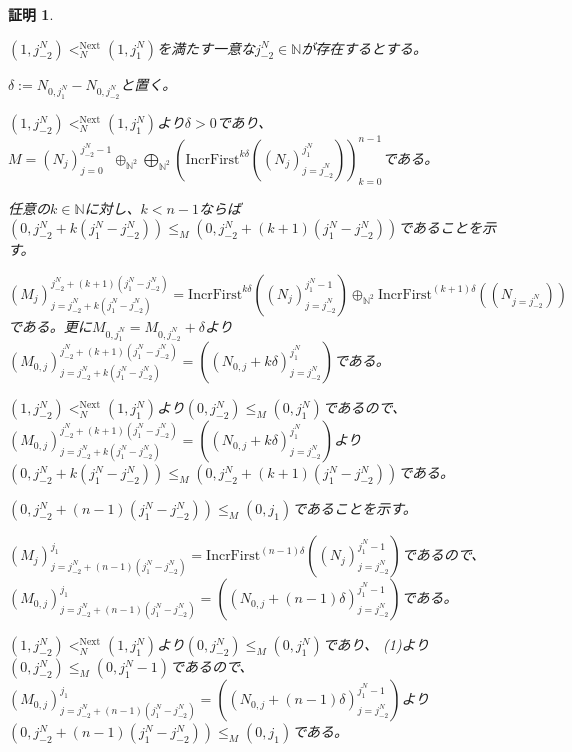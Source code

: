\documentclass[dvipdfmx,uplatex]{jsarticle}
\theoremstyle{customnonumberbreakfortheorem}
\theoremstyle{customnonumberbreakforproof}
\newtheorem{hideableproof}{証明}
\begin{document}
\begin{hideableproof}
\begin{indented}
\begin{indented}
\begin{indented}
				\item \((1,j_{-2}^N) <_N^{\textrm{Next}} (1,j_1^N)\)を満たす一意な\(j_{-2}^N \in \mathbb{N}\)が存在するとする。
				\begin{indented}
					\item \(\delta := N_{0,j_1^N} - N_{0,j_{-2}^N}\)と置く。
					\item \((1,j_{-2}^N) <_N^{\textrm{Next}} (1,j_1^N)\)より\(\delta > 0\)であり、\(M = (N_j)_{j=0}^{j_{-2}^N-1} \oplus_{\mathbb{N}^2} \bigoplus_{\mathbb{N}^2} (\textrm{IncrFirst}^{k \delta}((N_j)_{j=j_{-2}^N}^{j_1^N}))_{k=0}^{n-1}\)である。
					\item
					\item 任意の\(k \in \mathbb{N}\)に対し、\(k < n-1\)ならば\((0,j_{-2}^N+k(j_1^N-j_{-2}^N)) \leq_M (0,j_{-2}^N+(k+1)(j_1^N-j_{-2}^N))\)であることを示す。
					\begin{indented}
						\item \((M_j)_{j =j_{-2}^N+k(j_1^N-j_{-2}^N)}^{j_{-2}^N+(k+1)(j_1^N-j_{-2}^N)} = \textrm{IncrFirst}^{k \delta}((N_j)_{j=j_{-2}^N}^{j_1^N-1}) \oplus_{\mathbb{N}^2} \textrm{IncrFirst}^{(k+1)\delta}((N_{j=j_{-2}^N}))\)である。更に\(M_{0,j_1^N} = M_{0,j_{-2}^N}+\delta\)より\((M_{0,j})_{j =j_{-2}^N+k(j_1^N-j_{-2}^N)}^{j_{-2}^N+(k+1)(j_1^N-j_{-2}^N)} = ((N_{0,j}+k \delta)_{j=j_{-2}^N}^{j_1^N})\)である。
						\item \((1,j_{-2}^N) <_N^{\textrm{Next}} (1,j_1^N)\)より\((0,j_{-2}^N) \leq_M (0,j_1^N)\)であるので、\((M_{0,j})_{j =j_{-2}^N+k(j_1^N-j_{-2}^N)}^{j_{-2}^N+(k+1)(j_1^N-j_{-2}^N)} = ((N_{0,j}+k \delta)_{j=j_{-2}^N}^{j_1^N})\)より\((0,j_{-2}^N+k(j_1^N-j_{-2}^N)) \leq_M (0,j_{-2}^N+(k+1)(j_1^N-j_{-2}^N))\)である。
					\end{indented}
					\item
					\item \((0,j_{-2}^N+(n-1)(j_1^N-j_{-2}^N)) \leq_M (0,j_1)\)であることを示す。
					\begin{indented}
						\item \((M_j)_{j =j_{-2}^N+(n-1)(j_1^N-j_{-2}^N)}^{j_1} = \textrm{IncrFirst}^{(n-1)\delta}((N_j)_{j=j_{-2}^N}^{j_1^N-1})\)であるので、\((M_{0,j})_{j =j_{-2}^N+(n-1)(j_1^N-j_{-2}^N)}^{j_1} = ((N_{0,j}+(n-1)\delta)_{j=j_{-2}^N}^{j_1^N-1})\)である。
						\item \((1,j_{-2}^N) <_N^{\textrm{Next}} (1,j_1^N)\)より\((0,j_{-2}^N) \leq_M (0,j_1^N)\)であり、 (1)より\((0,j_{-2}^N) \leq_M (0,j_1^N-1)\)であるので、\((M_{0,j})_{j =j_{-2}^N+(n-1)(j_1^N-j_{-2}^N)}^{j_1} = ((N_{0,j}+(n-1)\delta)_{j=j_{-2}^N}^{j_1^N-1})\)より\((0,j_{-2}^N+(n-1)(j_1^N-j_{-2}^N)) \leq_M (0,j_1)\)である。

\end{indented}
\end{indented}
\end{indented}
\end{indented}
\end{indented}
\end{hideableproof}
\end{document}

